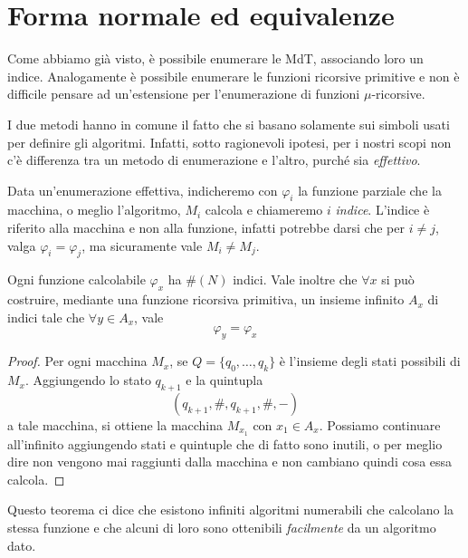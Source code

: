 \section{Forma normale ed equivalenze}
Come abbiamo già visto, è possibile enumerare le MdT, associando
loro un indice. Analogamente è possibile enumerare le funzioni
ricorsive primitive e non è difficile pensare ad un'estensione
per l'enumerazione di funzioni $\mu$-ricorsive.

I due metodi hanno in comune il fatto che si basano solamente
sui simboli usati per definire gli algoritmi. Infatti, sotto
ragionevoli ipotesi, per i nostri scopi non c'è differenza tra
un metodo di enumerazione e l'altro, purché sia \emph{effettivo}.

Data un'enumerazione effettiva, indicheremo con $\varphi_i$ la
funzione parziale che la macchina, o meglio l'algoritmo, $M_i$
calcola e chiameremo $i$ \emph{indice}. L'indice è riferito
alla macchina e non alla funzione, infatti potrebbe darsi che
per $i \neq j$, valga $\varphi_i = \varphi_j$, ma sicuramente
vale $M_i \neq M_j$.

\begin{theorem} \label{th: padding lemma}
	Ogni funzione calcolabile $\varphi_x$ ha $\# (N)$ indici.
	Vale inoltre che $\forall x$ si può costruire, mediante una
	funzione ricorsiva primitiva, un insieme infinito $A_x$ di
	indici tale che $\forall y \in A_x$, vale
	\[ \varphi_y = \varphi_x \]
	\begin{proof}
		Per ogni macchina $M_x$, se $Q = \{ q_0, \dots, q_k \}$
		è l'insieme degli stati possibili di $M_x$. Aggiungendo
		lo stato $q_{k+1}$ e la quintupla
		\[ (q_{k+1}, \#, q_{k+1}, \#, -) \]
		a tale macchina, si ottiene la macchina $M_{x_1}$ con
		$x_1 \in A_x$. Possiamo continuare all'infinito
		aggiungendo stati e quintuple che di fatto sono inutili,
		o per meglio dire non vengono mai raggiunti dalla
		macchina e non cambiano quindi cosa essa calcola.
	\end{proof}
\end{theorem}

Questo teorema ci dice che esistono infiniti algoritmi
numerabili che calcolano la stessa funzione e che alcuni di
loro sono ottenibili \emph{facilmente} da un algoritmo dato.

